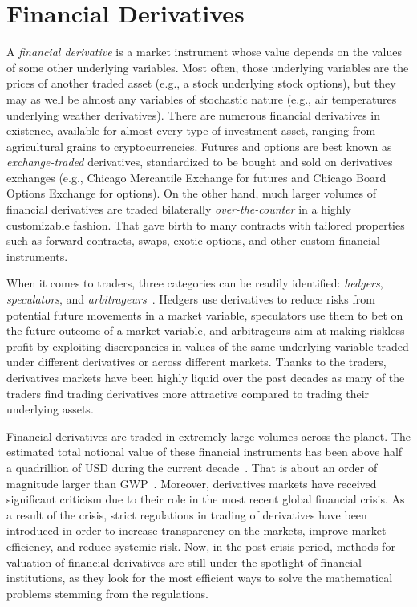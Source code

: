 \documentclass{UUThesisTemplate}
\begin{document}
%
\chapter{Financial Derivatives}
\label{ch:finder}

\par
A \emph{financial derivative} is a market instrument whose value depends on the values of some other underlying variables. Most often, those underlying variables are the prices of another traded asset (e.g., a stock underlying stock options), but they may as well be almost any variables of stochastic nature (e.g., air temperatures underlying weather derivatives). There are numerous financial derivatives in existence, available for almost every type of investment asset, ranging from agricultural grains to cryptocurrencies. Futures and options are best known as \emph{exchange-traded} derivatives, standardized to be bought and sold on derivatives exchanges (e.g., Chicago Mercantile Exchange for futures and Chicago Board Options Exchange for options). On the other hand, much larger volumes of financial derivatives are traded bilaterally \emph{over-the-counter} in a highly customizable fashion. That gave birth to many contracts with tailored properties such as forward contracts, swaps, exotic options, and other custom financial instruments.

\par
When it comes to traders, three categories can be readily identified: \emph{hedgers}, \emph{speculators}, and \emph{arbitrageurs}~\cite{hull2017options}. Hedgers use derivatives to reduce risks from potential future movements in a market variable, speculators use them to bet on the future outcome of a market variable, and arbitrageurs aim at making riskless profit by exploiting discrepancies in values of the same underlying variable traded under different derivatives or across different markets. Thanks to the traders, derivatives markets have been highly liquid over the past decades as many of the traders find trading derivatives more attractive compared to trading their underlying assets.

\par
Financial derivatives are traded in extremely large volumes across the planet. %
The estimated total notional value of these financial instruments has been above half a quadrillion of USD during the current decade~\cite{bank2018annual}. That is about an order of magnitude larger than GWP~\cite{worldgdp2018annual}. Moreover, derivatives markets have received significant criticism due to their role in the most recent global financial crisis.  As a result of the crisis, strict regulations in trading of derivatives have been introduced in order to increase transparency on the markets, improve market efficiency, and reduce systemic risk. Now, in the post-crisis period, methods for valuation of financial derivatives are still under the spotlight of financial institutions, as they look for the most efficient ways to solve the mathematical problems stemming from the regulations.
\end{document}
